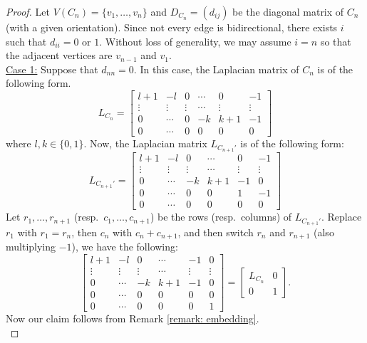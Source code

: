 \documentclass[11pt,reqno]{amsart}
\theoremstyle{definition}
\theoremstyle{plain}
\begin{document}
\begin{proof}
Let $V(C_n)=\{v_1,\dots,v_n\}$ and $D_{C_n} = (d_{ij})$ be the diagonal matrix of $C_n$ (with a given orientation). Since not every edge is bidirectional, there exists $i$ such that $d_{ii} = 0$ or $1$. Without loss of generality, we may assume $i = n$ so that the adjacent vertices are $v_{n-1}$ and $v_1$.  \\

\noindent \underline{Case 1:} Suppose that $d_{nn} = 0$. In this case, the Laplacian matrix of $C_n$ is of the following form. 
\begin{equation}
L_{C_n} = 
\begin{bmatrix}
l + 1 & -l & 0 & \cdots & 0 & -1 \\
\vdots & \vdots & \vdots & \cdots & \vdots &\vdots \\
0 & \cdots & 0 & -k & k+1 & -1 \\
0 & \cdots & 0 & 0 & 0 & 0 
\end{bmatrix}
\end{equation}
where $l, k \in \{ 0, 1 \}$. Now, the Laplacian matrix $L_{C_{n+1}'}$ is of the following form:
\[
L_{C_{n+1}'} = 
\begin{bmatrix} 
	l + 1 & -l & 0 & \cdots & 0 & -1 \\
	\vdots & \vdots & \vdots & \cdots & \vdots & \vdots  \\
	0 & \cdots & -k & k+1 & -1 &0 \\
	0 & \cdots & 0 & 0 & 1 & -1 \\
	0 & \cdots & 0 & 0 & 0 & 0 
\end{bmatrix} 
\]
Let $r_1,\dots,r_{n+1}$ (resp.~$c_1,\dots,c_{n+1}$) be the rows (resp.~columns) of $L_{C_{n+1}'}$. Replace $r_1$ with $r_1=r_n$, then $c_n$ with $c_n+c_{n+1}$, and then switch $r_n$ and $r_{n+1}$ (also multiplying $-1$), we have the following:
\[
\begin{bmatrix} 
	l + 1 & -l & 0 & \cdots & -1 & 0 \\
	\vdots & \vdots & \vdots & \cdots & \vdots & \vdots  \\
	0 & \cdots & -k & k+1 & -1 &0 \\
	0 & \cdots & 0 & 0 & 0 & 0 \\
	0 & \cdots & 0 & 0 & 0 & 1 
\end{bmatrix}  = \left[ \begin{array}{c|c}
L_{C_n} & 0 \\
\hline
0 & 1
\end{array} \right].
\]
Now our claim follows from Remark \ref{remark: embedding}. \\

\end{proof}
\end{document}
